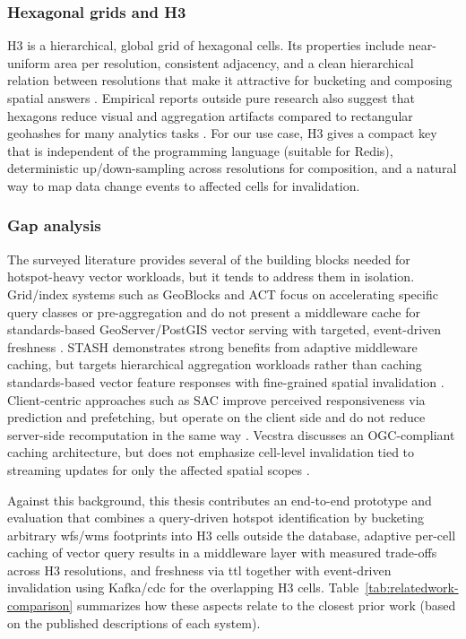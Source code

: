 \subsubsection{Hexagonal grids and H3}
H3 is a hierarchical, global grid of hexagonal cells. Its properties include near-uniform area per resolution, consistent adjacency, and a clean hierarchical relation between resolutions that make it attractive for bucketing and composing spatial answers \cite{H3docs}. Empirical reports outside pure research also suggest that hexagons reduce visual and aggregation artifacts compared to rectangular geohashes for many analytics tasks \cite{Drapier2024_H3}. For our use case, H3 gives a compact key that is independent of the programming language (suitable for Redis), deterministic up/down-sampling across resolutions for composition, and a natural way to map data change events to affected cells for invalidation.

\subsubsection{Gap analysis}
The surveyed literature provides several of the building blocks needed for hotspot-heavy vector workloads, but it tends to address them in isolation. Grid/index systems such as GeoBlocks and ACT focus on accelerating specific query classes or pre-aggregation and do not present a middleware cache for standards-based GeoServer/PostGIS vector serving with targeted, event-driven freshness \cite{Winter2021_GeoBlocks,Kipf2020_ACT}. STASH demonstrates strong benefits from adaptive middleware caching, but targets hierarchical aggregation workloads rather than caching standards-based vector feature responses with fine-grained spatial invalidation \cite{Mitra2019_STASH}. Client-centric approaches such as SAC improve perceived responsiveness via prediction and prefetching, but operate on the client side and do not reduce server-side recomputation in the same way \cite{Liu2013_SAC}. Vecstra discusses an OGC-compliant caching architecture, but does not emphasize cell-level invalidation tied to streaming updates for only the affected spatial scopes \cite{Wang2018_Vecstra}.

Against this background, this thesis contributes an end-to-end prototype and evaluation that combines a query-driven hotspot identification by bucketing arbitrary \ac{wfs}/\ac{wms} footprints into H3 cells outside the database, adaptive per-cell caching of vector query results in a middleware layer with measured trade-offs across H3 resolutions, and freshness via \ac{ttl} together with event-driven invalidation using Kafka/\ac{cdc} for the overlapping H3 cells. Table~\ref{tab:relatedwork-comparison} summarizes how these aspects relate to the closest prior work (based on the published descriptions of each system).

